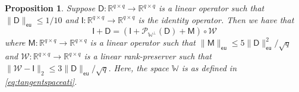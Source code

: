 \documentclass[11pt,letterpaper]{article}
\newtheorem{proposition}[theorem]{Proposition}
\newcommand{\R}{\mathbb{R}}
\newcommand{\cp}{\mathcal{P}}
\newcommand{\sfd}{\mathsf{D}}
\newcommand{\sfi}{\mathsf{I}}
\newcommand{\sfm}{\mathsf{M}}
\newcommand{\eu}{\mathsf{eu}}
\begin{document}
\begin{proposition} \label{thm:induction}
Suppose $\sfd : \R^{q \times q} \rightarrow \R^{q \times q}$ is a linear operator such that $\|\sfd \|_{\eu} \leq 1/10$ and $\sfi : \R^{q \times q} \rightarrow \R^{q \times q}$ is the identity operator.  Then we have that
\begin{equation*}
\sfi + \sfd  = (\sfi + \cp_{\mathbb{W}^{\perp}} (\sfd) + \sfm ) \circ \mathcal{W}
\end{equation*}
where $\sfm : \R^{q \times q} \rightarrow \R^{q \times q}$ is a linear operator such that $\|\sfm\|_{\eu} \leq 5 \| \sfd \|_{\eu}^2 / \sqrt{q}$ and $\mathcal{W} : \R^{q \times q} \rightarrow \R^{q \times q}$ is a linear rank-preserver such that $\|\mathcal{W} - \sfi\|_2 \leq  3\|\sfd\|_{\eu}/\sqrt{q}$.  Here, the space $\mathbb{W}$ is as defined in \eqref{eq:tangentspaceati}.
\end{proposition}
\end{document}
